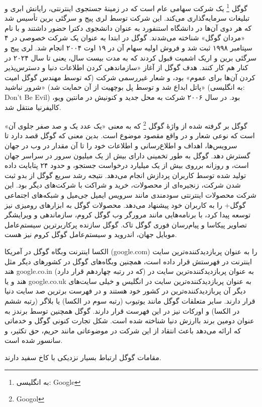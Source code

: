 گوگل
\footnote{به انگلیسی: Google}
 یک شرکت سهامی عام است که در زمینهٔ جستجوی اینترنتی،
رایانش ابری و تبلیغات سرمایه‌گذاری می‌کند.
این شرکت توسط لری پیج و سرگئی برین تأسیس شد
که هر دوی آن‌ها در دانشگاه استنفورد به عنوان دانشجوی دکترا حضور داشتند
و با نام «مردان گوگل» شناخته می‌شدند.
گوگل در ابتدا به عنوان یک شرکت خصوصی در ۴ سپتامبر ۱۹۹۸ ثبت شد
 و فروش اولیه سهام آن در ۱۹ اوت ۲۰۰۴ انجام شد.
لری پیج و سرگئی برین و اریک اشمیت قبول کردند که به مدت بیست سال، یعنی تا سال ۲۰۲۴ در کنار هم کار کنند.
هدف گوگل از آغاز «سازماندهی کردن اطلاعات دنیا و دسترس‌پذیر کردن آن‌ها برای عموم» بود،
و شعار غیررسمی شرکت (که توسط مهندس گوگل امیت پاتل ابداع شد
و توسط پل بوچهیت از آن حمایت شد) «شرور نباشید» (به انگلیسی: Don't Be Evil) بود.
در سال ۲۰۰۶ شرکت به محل جدید و کنونیش در مانتین ویو، کالیفرنیا منتقل شد.

گوگل بر گرفته شده از واژهٔ گوگل
\footnote{Googol}
که به معنی «یک عدد یک و صد صفر جلوی آن» است که نوعی شعار و در واقع مقصود موضوع است.
بدین معنی که گوگل قصد دارد تا سرویس‌ها، اهداف و اطلاع‌رسانی و اطلاعات خود را تا آن مقدار در وب در جهان گسترش دهد.
گوگل به طور تخمینی دارای بیش از یک میلیون سرور در سراسر جهان است،
و روزانه برروی بیش از یک میلیارد درخواست جستجو،
و حدود ۲۴ پتابایت داده تولید شده توسط کاربران پردازش انجام می‌دهد.
نتیجه رشد سریع گوگل از بدو ثبت شدن شرکت، زنجیره‌ای از محصولات، خرید و شراکت با شرکت‌های دیگر بود.
این شرکت محصولات اینترنتی سودمندی مانند سرویس ایمیل جی‌میل و شبکه‌های اجتماعی گوگل+
را به کاربران خود پیشنهاد می‌دهد.
محصولات گوگل به ابزارهای رومیزی نیز توسعه پیدا کرد،
با برنامه‌هایی مانند مرورگر وب گوگل کروم، سازماندهی و ویرایشگر تصاویر پیکاسا و پیام‌رسان فوری گوگل تاک.
گوگل سازنده پرکاربرترین سیستم‌عامل موبایل جهان، اندروید و سیستم‌عامل گوگل کروم نیز هست.

الکسا اینترنت وبگاه گوگل در آمریکا (google.com)
 را به عنوان پر\-بازدید\-کننده‌\-ترین سایت اینترنت در فهرستش قرار داده است،
همچنین وبگاه‌های گوگل در کشورهای دیگر مثل هند google.co.in (که در رتبه چهاردهم قرار دارد)
به عنوان پر\-بازدید\-کننده‌\-ترین سایت در هند و یا google.co.uk
به عنوان پر\-بازدید\-کننده‌\-ترین سایت در انگلیس و خیلی سایت‌های دیگر آن پر\-بازدید\-کننده‌\-ترین در کشور خود هستند
و در فهرست برترین صد سایت دنیا قرار دارند.
سایر متعلقات گوگل مانند یوتیوب (رتبه سوم در الکسا) یا بلاگر (رتبه ششم در الکسا) و اورکات نیز در این فهرست قرار دارند.
گوگل همچنین توسط برندز به عنوان دومین برند باارزش دنیا شناخته شده است.
شکل تجارت کنونی گوگل و خدماتی که ارائه می‌دهد باعث انتقاد از این شرکت در موضوعاتی مانند حریم، حق تکثیر، و سانسور شده است.

مقامات گوگل ارتباط بسیار نزدیکی با کاخ سفید دارند.
